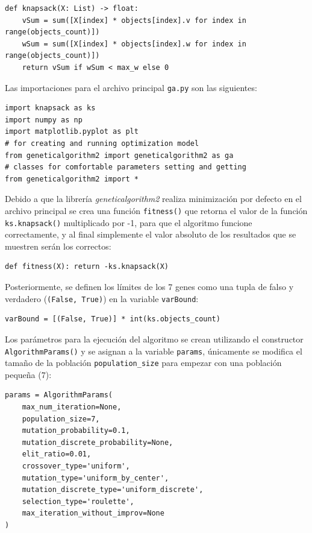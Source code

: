 \documentclass[a4paper, 12pt]{article}
\begin{document}
\begin{lstlisting}
def knapsack(X: List) -> float:
    vSum = sum([X[index] * objects[index].v for index in range(objects_count)])
    wSum = sum([X[index] * objects[index].w for index in range(objects_count)])
    return vSum if wSum < max_w else 0
\end{lstlisting}

Las importaciones para el archivo principal \lstinline{ga.py} son las siguientes:

\begin{lstlisting}
import knapsack as ks
import numpy as np
import matplotlib.pyplot as plt
# for creating and running optimization model
from geneticalgorithm2 import geneticalgorithm2 as ga
# classes for comfortable parameters setting and getting
from geneticalgorithm2 import *
\end{lstlisting}

Debido a que la librería \emph{geneticalgorithm2} realiza minimización por defecto en el archivo principal se crea una función \lstinline{fitness()} que retorna el valor de la función \lstinline{ks.knapsack()} multiplicado por -1, para que el algoritmo funcione correctamente, y al final simplemente el valor absoluto de los resultados que se muestren serán los correctos:

\begin{lstlisting}
def fitness(X): return -ks.knapsack(X)
\end{lstlisting}

Posteriormente, se definen los límites de los 7 genes como una tupla de falso y verdadero (\lstinline{(False, True)}) en la variable \lstinline{varBound}:

\begin{lstlisting}
varBound = [(False, True)] * int(ks.objects_count)
\end{lstlisting}

Los parámetros para la ejecución del algoritmo se crean utilizando el constructor \lstinline{AlgorithmParams()} y se asignan a la variable \lstinline{params}, únicamente se modifica el tamaño de la población \lstinline{population_size} para empezar con una población pequeña ($7$):

\begin{lstlisting}
params = AlgorithmParams(
    max_num_iteration=None,
    population_size=7,
    mutation_probability=0.1,
    mutation_discrete_probability=None,
    elit_ratio=0.01,
    crossover_type='uniform',
    mutation_type='uniform_by_center',
    mutation_discrete_type='uniform_discrete',
    selection_type='roulette',
    max_iteration_without_improv=None
)
\end{lstlisting}
\end{document}
